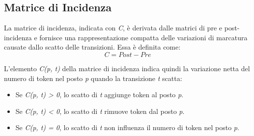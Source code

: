 \subsection{Matrice di Incidenza}
La matrice di incidenza, indicata con \textit{C}, è derivata dalle matrici di pre e post-incidenza e fornisce una rappresentazione compatta delle variazioni di marcatura causate dallo scatto delle transizioni. Essa è definita come:
\begin{equation}
    C = Post - Pre
\end{equation}

L'elemento \textit{C(p, t)} della matrice di incidenza indica quindi la variazione netta del numero di token nel posto \textit{p} quando la transizione \textit{t} scatta:

\begin{itemize}
    \item Se \textit{C(p, t) > 0}, lo scatto di \textit{t} aggiunge token al posto \textit{p}.
    \item Se \textit{C(p, t) < 0}, lo scatto di \textit{t} rimuove token dal posto \textit{p}.
    \item Se \textit{C(p, t) = 0}, lo scatto di \textit{t} non influenza il numero di token nel posto \textit{p}.
\end{itemize}